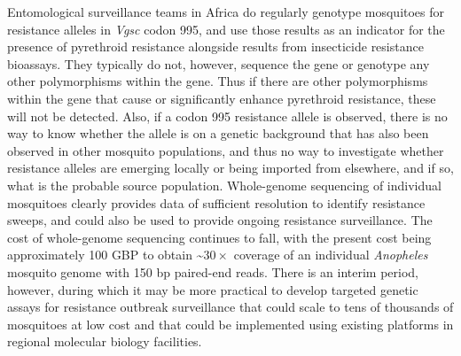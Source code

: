 \documentclass[a4paper,11pt,abstracton,hidelinks]{scrartcl}
\begin{document}
%
Entomological surveillance teams in Africa do regularly genotype mosquitoes for resistance alleles in \textit{Vgsc} codon 995, and use those results as an indicator for the presence of pyrethroid resistance alongside results from insecticide resistance bioassays.
%
They typically do not, however, sequence the gene or genotype any other polymorphisms within the gene.
%
Thus if there are other polymorphisms within the gene that cause or significantly enhance pyrethroid resistance, these will not be detected.
%
Also, if a codon 995 resistance allele is observed, there is no way to know whether the allele is on a genetic background that has also been observed in other mosquito populations, and thus no way to investigate whether resistance alleles are emerging locally or being imported from elsewhere, and if so, what is the probable source population.
%
Whole-genome sequencing of individual mosquitoes clearly provides data of sufficient resolution to identify resistance sweeps, and could also be used to provide ongoing resistance surveillance.
%
The cost of whole-genome sequencing continues to fall, with the present cost being approximately 100 GBP to obtain \textasciitilde$30\times$ coverage of an individual \emph{Anopheles} mosquito genome with 150 bp paired-end reads.
%
There is an interim period, however, during which it may be more practical to develop targeted genetic assays for resistance outbreak surveillance that could scale to tens of thousands of mosquitoes at low cost and that could be implemented using existing platforms in regional molecular biology facilities.
%
\end{document}
